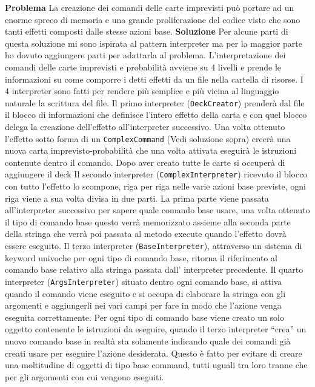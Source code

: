 \textbf{Problema}\newline
La creazione dei comandi delle carte imprevisti può portare ad un enorme spreco di memoria e una grande proliferazione del codice visto che sono tanti effetti composti dalle stesse azioni base.  \newline
\textbf{Soluzione}\newline
Per alcune parti di questa soluzione mi sono ispirata al pattern interpreter ma per la maggior parte ho dovuto aggiungere parti per adattarla al problema. 
L’interpretazione dei comandi delle carte imprevisti e probabilità avviene su 4 livelli e prende le informazioni su come comporre i detti effetti da un file nella cartella di risorse. 
I 4 interpreter sono fatti per rendere più semplice e più vicina al linguaggio naturale la scrittura del file. 
Il primo interpreter (\texttt{DeckCreator}) prenderà dal file il blocco di informazioni che definisce l’intero effetto della carta e con quel blocco delega la creazione dell’effetto all’interpreter successivo. Una volta ottenuto l’effetto sotto forma di un \texttt{ComplexCommand} (Vedi soluzione sopra) creerà una nuova carta imprevisto-probabilità che una volta attivata eseguirà le istruzioni contenute dentro il comando. Dopo aver creato tutte le carte si occuperà di aggiungere il deck
Il secondo interpreter (\texttt{ComplexInterpreter}) ricevuto il blocco con tutto l’effetto lo scompone, riga per riga nelle varie azioni base previste, ogni riga viene a sua volta divisa in due parti. 
La prima parte viene passata all’interpreter successivo per sapere quale comando base usare, una volta ottenuto il tipo di comando base questo verrà memorizzato assieme alla seconda parte della stringa che verrà poi passata al metodo execute quando l’effetto dovrà essere eseguito.  
Il terzo interpreter (\texttt{BaseInterpreter}), attraverso un sistema di keyword univoche per ogni tipo di comando base, ritorna il riferimento al comando base relativo alla stringa passata dall’ interpreter precedente.
Il quarto interpreter (\texttt{ArgsInterpreter}) situato dentro ogni comando base, si attiva quando il comando viene eseguito e si occupa di elaborare la stringa con gli argomenti e aggiungerli nei vari campi per fare in modo che l’azione venga eseguita correttamente.
Per ogni tipo di comando base viene creato un solo oggetto contenente le istruzioni da eseguire, quando il terzo interpreter “crea” un nuovo comando base in realtà sta solamente indicando quale dei comandi già creati usare per eseguire l’azione desiderata.
Questo è fatto per evitare di creare una moltitudine di oggetti di tipo base command, tutti uguali tra loro tranne che per gli argomenti con cui vengono eseguiti.
